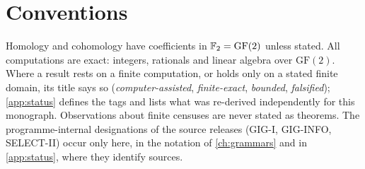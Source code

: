 \section{Conventions}
Homology and cohomology have coefficients in $\mathbb{F}_2=\mathrm{GF}(2)$ unless stated. All computations are exact: integers, rationals and linear algebra over $\mathrm{GF}(2)$. Where a result rests on a finite computation, or holds only on a stated finite domain, its title says so (\emph{computer-assisted}, \emph{finite-exact}, \emph{bounded}, \emph{falsified}); \cref{app:status} defines the tags and lists what was re-derived independently for this monograph. Observations about finite censuses are never stated as theorems. The programme-internal designations of the source releases (GIG-I, GIG-INFO, SELECT-II) occur only here, in the notation of \cref{ch:grammars} and in \cref{app:status}, where they identify sources.
